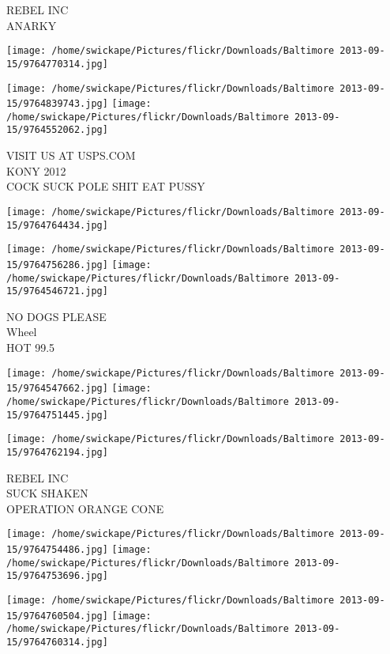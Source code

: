\documentclass[10pt,letterpaper]{article}
\begin{document}
REBEL INC\\
ANARKY
\pagebreak

\texttt{[image: /home/swickape/Pictures/flickr/Downloads/Baltimore 2013-09-15/9764770314.jpg]}

\vspace{0.25in}
\texttt{[image: /home/swickape/Pictures/flickr/Downloads/Baltimore 2013-09-15/9764839743.jpg]}
\texttt{[image: /home/swickape/Pictures/flickr/Downloads/Baltimore 2013-09-15/9764552062.jpg]}

VISIT US AT USPS.COM\\
KONY 2012\\
COCK SUCK POLE SHIT EAT PUSSY
\pagebreak

\texttt{[image: /home/swickape/Pictures/flickr/Downloads/Baltimore 2013-09-15/9764764434.jpg]}

\vspace{0.25in}
\texttt{[image: /home/swickape/Pictures/flickr/Downloads/Baltimore 2013-09-15/9764756286.jpg]}
\texttt{[image: /home/swickape/Pictures/flickr/Downloads/Baltimore 2013-09-15/9764546721.jpg]}

NO DOGS PLEASE\\
Wheel\\
HOT 99.5
\pagebreak

\texttt{[image: /home/swickape/Pictures/flickr/Downloads/Baltimore 2013-09-15/9764547662.jpg]}
\texttt{[image: /home/swickape/Pictures/flickr/Downloads/Baltimore 2013-09-15/9764751445.jpg]}

\vspace{0.25in}
\texttt{[image: /home/swickape/Pictures/flickr/Downloads/Baltimore 2013-09-15/9764762194.jpg]}

REBEL INC\\
SUCK SHAKEN\\
OPERATION ORANGE CONE
\pagebreak

\texttt{[image: /home/swickape/Pictures/flickr/Downloads/Baltimore 2013-09-15/9764754486.jpg]}
\texttt{[image: /home/swickape/Pictures/flickr/Downloads/Baltimore 2013-09-15/9764753696.jpg]}

\texttt{[image: /home/swickape/Pictures/flickr/Downloads/Baltimore 2013-09-15/9764760504.jpg]}
\texttt{[image: /home/swickape/Pictures/flickr/Downloads/Baltimore 2013-09-15/9764760314.jpg]}
\end{document}
